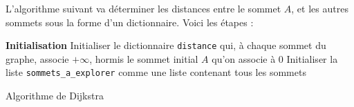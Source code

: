 L'algorithme suivant va déterminer les distances entre le sommet $A$, et les autres sommets sous la forme d'un dictionnaire. Voici les étapes :\\
\begin{algorithm}[H]
\SetAlgoLined
 \textbf{Initialisation}\;
 Initialiser le dictionnaire \texttt{distance} qui, à chaque sommet du graphe, associe $+\infty$, hormis le sommet initial $A$ qu'on associe à $0$ \;
 Initialiser la liste \texttt{sommets\_a\_explorer} comme une liste contenant tous les sommets \;
 \caption{Algorithme de Dijkstra}
\end{algorithm}
